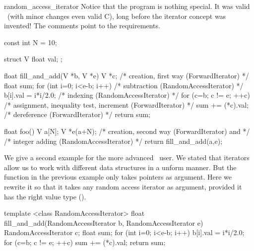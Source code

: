 \begin{ccClass}{random_access_iterator}
Notice that the program is nothing special. It was valid \CC\ (with minor
changes even valid C), long before the iterator concept was invented!
The comments point to the requirements. 

\newpage

\begin{cprog}

const int N = 10;

struct V {
   float val;
};

float fill_and_add(V *b, V *e)
{
    V *c;                             /* creation, first way (ForwardIterator) */
    float sum;
    for (int i=0; i<e-b; i++)    /* subtraction (RandomAccessIterator) */
        b[i].val = i*i/2.0;        /* indexing (RandomAccessIterator) */
    for (c=b; c != e; ++c)         /* assignment, inequality test, increment (ForwardIterator)  */
        sum += (*c).val;           /* dereference (ForwardIterator) */
    return sum;
}

float foo()
{
    V a[N];
    V *e(a+N);                       /* creation, second way (ForwardIterator) and */
                                      /* integer adding (RandomAccessIterator) */
    return fill_and_add(a,e); 
}
\end{cprog} 

\ccExample

We give a second example for the more advanced \stl\  user.  We stated
that iterators allow us to work with different data structures in a
unform manner.  But the function  in the
previous example only takes pointers as argument.  Here we rewrite it
so that it takes any random access iterator as argument, provided it
has the right value type ().

\begin{cprog}

template <class RandomAccessIterator>
float fill_and_add(RandomAccessIterator b, RandomAccessIterator e)
{
    RandomAccessIterator c;
    float sum;
    for (int i=0; i<e-b; i++)
        b[i].val = i*i/2.0;
    for (c=b; c != e; ++c)
        sum += (*c).val;
    return sum;
}
\end{cprog} 
\end{ccClass} 



